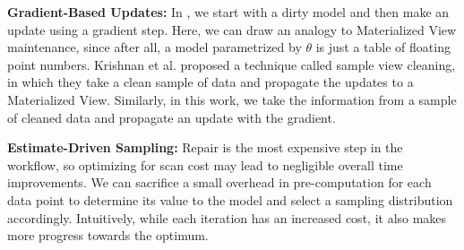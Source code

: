 \vspace{0.5em}

\noindent\textbf{Gradient-Based Updates: } In \sys, we start with a dirty model and then make an update using a gradient step. Here, we can draw an analogy to Materialized View maintenance, since after all, a model parametrized by $\theta$ is just a table of floating point numbers.
Krishnan et al. proposed a technique called sample view cleaning, in which they take a clean sample of data and propagate the updates to a Materialized View.
Similarly, in this work, we take the information from a sample of cleaned data and propagate an update with the gradient.

\vspace{0.5em}

\noindent\textbf{Estimate-Driven Sampling: } Repair is the most expensive step in the workflow, so optimizing for scan cost may lead to negligible overall time improvements.
We can sacrifice a small overhead in pre-computation for each data point to determine its value to the model and select a sampling distribution accordingly.
Intuitively, while each iteration has an increased cost, it also makes more progress towards the optimum.
\fi


